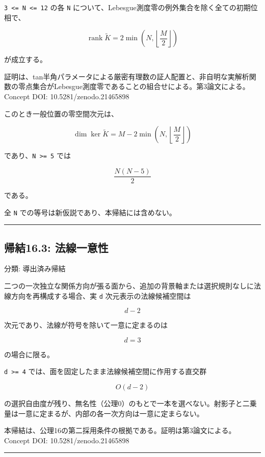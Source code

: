 \documentclass[
  a4paper,
]{ltjsarticle}
\begin{document}
\texttt{3\ \textless{}=\ N\ \textless{}=\ 12} の各 \texttt{N}
について、Lebesgue測度零の例外集合を除く全ての初期位相で、

\[
\operatorname{rank}\widetilde K
=
2\min\!\left(N,\left\lfloor\frac{M}{2}\right\rfloor\right)
\]

が成立する。

証明は、tan半角パラメータによる厳密有理数の証人配置と、非自明な実解析関数の零点集合がLebesgue測度零であることの組合せによる。第3論文による。Concept
DOI: 10.5281/zenodo.21465898

このとき一般位置の零空間次元は、

\[
\dim\ker\widetilde K
=
M-2\min\!\left(N,\left\lfloor\frac{M}{2}\right\rfloor\right)
\]

であり、\texttt{N\ \textgreater{}=\ 5} では

\[
\frac{N(N-5)}{2}
\]

である。

全 \texttt{N} での等号は新仮説であり、本帰結には含めない。

\begin{center}\rule{0.5\linewidth}{0.5pt}\end{center}

\subsection{帰結16.3:
法線一意性}\label{ux5e30ux7d5016.3-ux6cd5ux7ddaux4e00ux610fux6027}

分類: 導出済み帰結

二つの一次独立な関係方向が張る面から、追加の背景軸または選択規則なしに法線方向を再構成する場合、実
\texttt{d} 次元表示の法線候補空間は

\[
d-2
\]

次元であり、法線が符号を除いて一意に定まるのは

\[
d=3
\]

の場合に限る。

\texttt{d\ \textgreater{}=\ 4}
では、面を固定したまま法線候補空間に作用する直交群

\[
O(d-2)
\]

の選択自由度が残り、無名性（公理0）のもとで一本を選べない。射影子と二乗量は一意に定まるが、内部の各一次方向は一意に定まらない。

本帰結は、公理16の第二採用条件の根拠である。証明は第3論文による。Concept
DOI: 10.5281/zenodo.21465898

\begin{center}\rule{0.5\linewidth}{0.5pt}\end{center}
\end{document}
